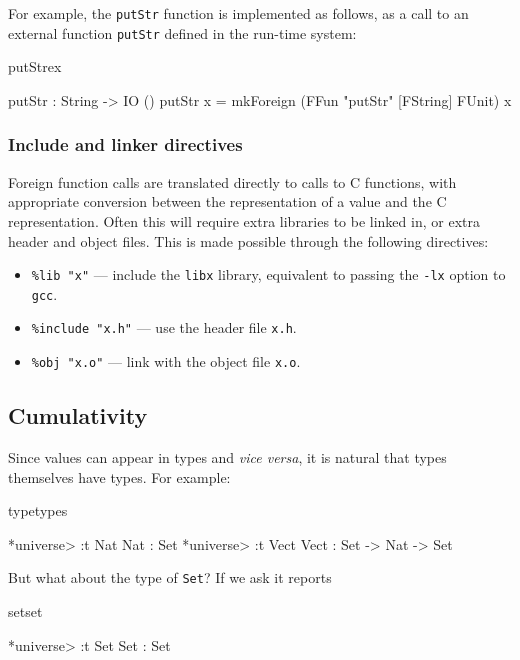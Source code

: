 \noindent
For example, the \texttt{putStr} function is implemented as follows, as a call to 
an external function \texttt{putStr} defined in the run-time system:

\begin{SaveVerbatim}{putStrex}

putStr : String -> IO ()
putStr x = mkForeign (FFun "putStr" [FString] FUnit) x
\end{SaveVerbatim}

\subsubsection*{Include and linker directives}

Foreign function calls are translated directly to calls to C functions, with appropriate
conversion between the \Idris{} representation of a value and the C representation.
Often this will require extra libraries to be linked in, or extra header and object files.
This is made possible through the following directives:

\begin{itemize}
\item \texttt{\%lib "x"} --- include the \texttt{libx} library, equivalent to passing the
\texttt{-lx} option to \texttt{gcc}.
\item \texttt{\%include "x.h"} --- use the header file \texttt{x.h}.
\item \texttt{\%obj "x.o"} --- link with the object file \texttt{x.o}.
\end{itemize}

\subsection{Cumulativity}

Since values can appear in types and \emph{vice versa}, it is natural that types themselves
have types. For example:

\begin{SaveVerbatim}{typetypes}

*universe> :t Nat
Nat : Set
*universe> :t Vect
Vect : Set -> Nat -> Set

\end{SaveVerbatim}

\noindent
But what about the type of \texttt{Set}? If we ask \Idris{} it reports

\begin{SaveVerbatim}{setset}

*universe> :t Set
Set : Set

\end{SaveVerbatim}

